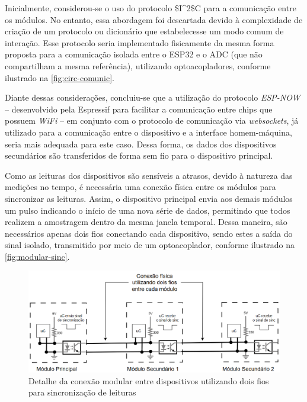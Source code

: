 Inicialmente, considerou-se o uso do protocolo \gls{$I^2$C} para a comunicação entre os módulos. No entanto, essa abordagem foi descartada devido à complexidade de criação de um protocolo ou dicionário que estabelecesse um modo comum de interação. Esse protocolo seria implementado fisicamente da mesma forma proposta para a comunicação isolada entre o ESP32 e o \gls{ADC} (que não compartilham a mesma referência), utilizando optoacopladores, conforme ilustrado na \autoref{fig:circ-comunic}.

Diante dessas considerações, concluiu-se que a utilização do protocolo \textit{ESP-NOW} – desenvolvido pela Espressif para facilitar a comunicação entre chips que possuem \textit{WiFi} – em conjunto com o protocolo de comunicação via \textit{websockets}, já utilizado para a comunicação entre o dispositivo e a interface homem-máquina, seria mais adequada para este caso. Dessa forma, os dados dos dispositivos secundários são transferidos de forma sem fio para o dispositivo principal.

Como as leituras dos dispositivos são sensíveis a atrasos, devido à natureza das medições no tempo, é necessária uma conexão física entre os módulos para sincronizar as leituras. Assim, o dispositivo principal envia aos demais módulos um pulso indicando o início de uma nova série de dados, permitindo que todos realizem a amostragem dentro da mesma janela temporal. Dessa maneira, são necessários apenas dois fios conectando cada dispositivo, sendo estes a saída do sinal isolado, transmitido por meio de um optoacoplador, conforme ilustrado na \autoref{fig:modular-sinc}.

\begin{figure}[htb!]
    \caption{Detalhe da conexão modular entre dispositivos utilizando dois fios para sincronização de leituras}
    \label{fig:modular-sinc}
    \includegraphics[width=1.0\textwidth]{figuras/mod-fisica-detalhe.png}
    \fonte{}
\end{figure}

